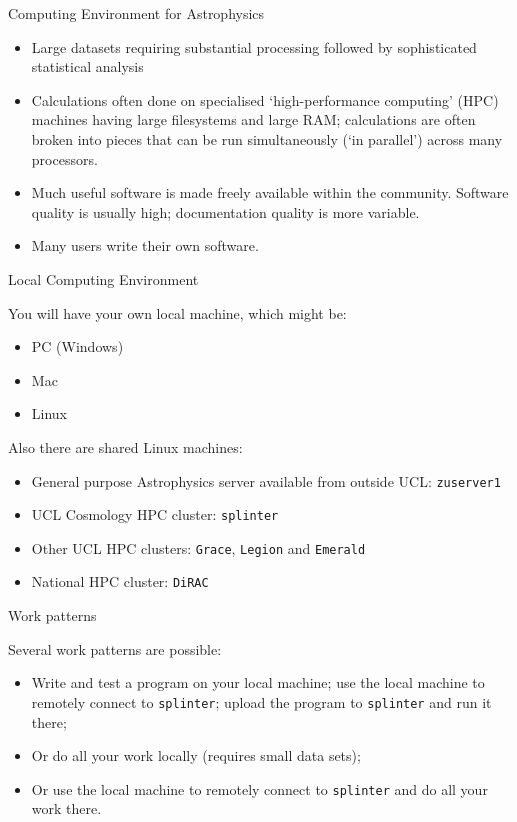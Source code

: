 \documentclass{beamer}
\begin{document}
\begin{frame}{Computing Environment for Astrophysics}
  \begin{itemize}
  \item Large datasets requiring substantial processing followed by sophisticated statistical analysis
  \item Calculations often done on specialised `high-performance computing' (HPC) machines having large filesystems and large RAM; calculations are often broken into pieces that can be run simultaneously (`in parallel') across many processors.
  \item Much useful software is made freely available within the community. Software quality is usually high; documentation quality is more variable.
  \item Many users write their own software.
  \end{itemize}
\end{frame}

\begin{frame}{Local Computing Environment}
  \begin{block}{You will have your own local machine, which might be:}
    \begin{itemize}
      \item PC (Windows)
      \item Mac
      \item Linux
    \end{itemize}
  \end{block}
  \begin{block}{Also there are shared Linux machines:}
    \begin{itemize}
      \item General purpose Astrophysics server available from outside UCL: \alert{\texttt{zuserver1}}
      \item UCL Cosmology HPC cluster: \alert{\texttt{splinter}}
      \item Other UCL HPC clusters: \alert{\texttt{Grace}}, \alert{\texttt{Legion}} and \alert{\texttt{Emerald}}
      \item National HPC cluster: \alert{\texttt{DiRAC}}
    \end{itemize}
  \end{block}
\end{frame}

\begin{frame}{Work patterns}
  \begin{block}{Several work patterns are possible:}
    \begin{itemize}
      \item Write and test a program on your local machine; use the local machine to remotely connect to \texttt{splinter}; upload the program to \texttt{splinter} and run it there;
      \item Or do all your work locally (requires small data sets);
      \item Or use the local machine to remotely connect to \texttt{splinter} and do all your work there.
    \end{itemize}
  \end{block}
\end{frame}
\end{document}
